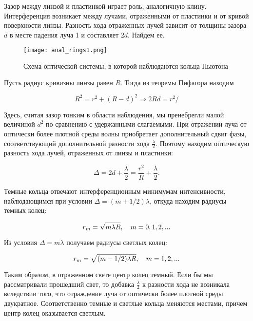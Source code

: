 Зазор между линзой и пластинкой играет роль, аналогичную клину. Интерференция возникает между лучами, отраженными от пластинки и от кривой поверхности линзы. Разность хода отраженных лучей зависит от толщины зазора $d$ в месте падения луча 1 и составляет $2d$. Найдем ее.

\bigskip



\begin{figure}[h!]
    \centering
    \texttt{[image: anal\_rings1.png]}
    \caption{Схема оптической системы, в которой наблюдаются кольца Ньютона}
    \label{fig:my_label}
\end{figure} 
Пусть радиус кривизны линзы равен $R$. Тогда из теоремы Пифагора находим

\begin{equation*}
    R^2 = r^2 + (R-d)^2 \Rightarrow 2Rd = r^2/
\end{equation*}

Здесь, считая зазор тонким в области наблюдения, мы пренебрегли малой величиной $d^2$ по сравнению с удержанными слагаемыми. При отражении луча от оптически более плотной среды волны приобретает дополнительный сдвиг фазы,  соответствующий дополнительной разности хода $\frac{\lambda}{2}$. Поэтому находим оптическую разность хода лучей, отраженных от линзы и пластинки:

\begin{equation*}
    \Delta = 2d + \frac{\lambda}{2} = \frac{r^2}{R} + \frac{\lambda}{2}.
\end{equation*}

Темные кольца отвечают интерференционным минимумам интенсивности, наблюдающимся при условии $\Delta = (m+1/2)\lambda$, откуда находим радиусы темных колец:

\begin{equation*}
    r_m = \sqrt{m\lambda R}, \hspace{10px} m = 0,1,2,...
\end{equation*}

Из условия $\Delta = m\lambda$ получаем радиусы светлых колец:

\begin{equation*}
    r_m = \sqrt{(m-1/2)\lambda R}, \hspace{10px} m = 1,2,...
\end{equation*}

Таким образом, в отраженном свете центр колец темный. Если бы мы рассматривали прошедший свет, то добавка $\frac{\lambda}{2}$ к разности хода не возникала вследствии того, что отраждение луча от оптически более плотной среды двукратное. Соответственно темные и светлые кольца меняются местами, причем центр колец оказывается светлым.

